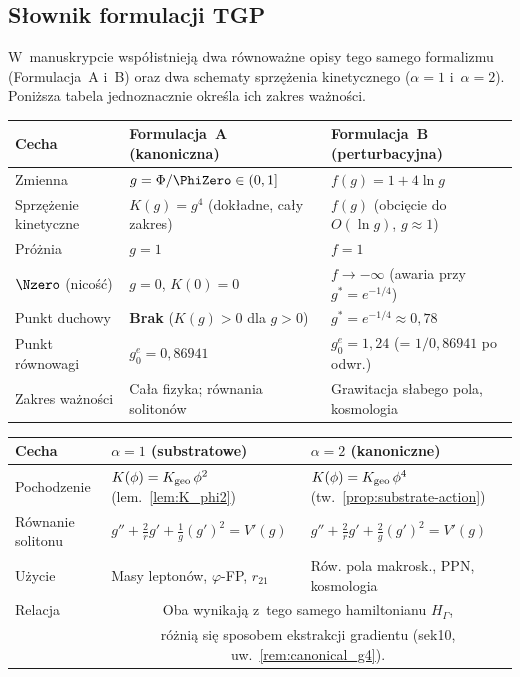 \subsection*{S\l{}ownik formulacji TGP}

W~manuskrypcie wsp\'o\l{}istniej\k{a} dwa r\'ownowa\.zne opisy
tego samego formalizmu (Formulacja~A i~B) oraz dwa schematy
sprz\k{e}\.zenia kinetycznego ($\alpha = 1$ i~$\alpha = 2$).
Poni\.zsza tabela jednoznacznie okre\'sla ich zakres wa\.zno\'sci.

\begin{center}\small
\renewcommand{\arraystretch}{1.3}
\begin{tabular}{@{}p{2.8cm}p{5.0cm}p{5.0cm}@{}}
\toprule
\textbf{Cecha} & \textbf{Formulacja~A (kanoniczna)} & \textbf{Formulacja~B (perturbacyjna)} \\
\midrule
Zmienna & $g = \Phi/\PhiZero \in (0,1]$ & $f(g) = 1 + 4\ln g$ \\
Sprz\k{e}\.zenie kinetyczne & $K(g) = g^4$ (dok\l{}adne, ca\l{}y zakres) & $f(g)$ (obci\k{e}cie do $O(\ln g)$, $g \approx 1$) \\
Pr\'o\.znia & $g = 1$ & $f = 1$ \\
$\Nzero$ (nico\'s\'c) & $g = 0$, $K(0) = 0$ & $f \to -\infty$ (awaria przy $g^* = e^{-1/4}$) \\
Punkt duchowy & \textbf{Brak} ($K(g) > 0$ dla $g > 0$) & $g^* = e^{-1/4} \approx 0{,}78$ \\
Punkt r\'ownowagi & $g_0^e = 0{,}86941$ & $g_0^e = 1{,}24$ (= $1/0{,}86941$ po odwr.) \\
Zakres wa\.zno\'sci & Ca\l{}a fizyka; r\'ownania soliton\'ow & Grawitacja s\l{}abego pola, kosmologia \\
\bottomrule
\end{tabular}
\end{center}

\begin{center}\small
\renewcommand{\arraystretch}{1.3}
\begin{tabular}{@{}p{2.8cm}p{5.0cm}p{5.0cm}@{}}
\toprule
\textbf{Cecha} & \textbf{$\alpha = 1$ (substratowe)} & \textbf{$\alpha = 2$ (kanoniczne)} \\
\midrule
Pochodzenie & $K(\phi) = K_{\rm geo}\,\phi^2$ (lem.~\ref{lem:K_phi2}) & $K(\phi) = K_{\rm geo}\,\phi^4$ (tw.~\ref{prop:substrate-action}) \\
R\'ownanie solitonu & $g'' + \frac{2}{r}g' + \frac{1}{g}(g')^2 = V'(g)$ & $g'' + \frac{2}{r}g' + \frac{2}{g}(g')^2 = V'(g)$ \\
U\.zycie & Masy lepton\'ow, $\varphi$-FP, $r_{21}$ & R\'ow. pola makrosk., PPN, kosmologia \\
Relacja & \multicolumn{2}{c}{Oba wynikaj\k{a} z~tego samego hamiltonianu $H_\Gamma$,} \\
        & \multicolumn{2}{c}{r\'o\.zni\k{a} si\k{e} sposobem ekstrakcji gradientu (sek10, uw.~\ref{rem:canonical_g4}).} \\
\bottomrule
\end{tabular}
\end{center}

